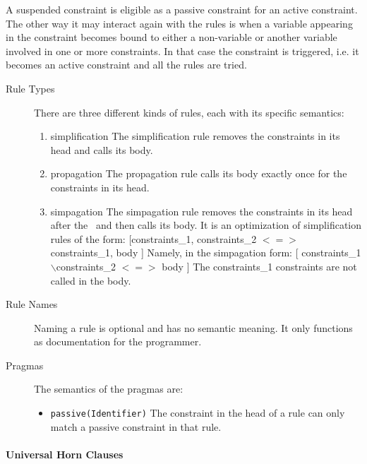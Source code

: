 \documentclass[thesis-solanki.tex]{subfiles}
\begin{document}
A suspended constraint is eligible as a passive constraint for an active constraint.
The other way it may interact again with the rules is when a variable appearing in the constraint becomes bound to
either a non-variable or another variable involved in one or more constraints.
In that case the constraint is triggered, i.e.\yyy{}{\Large,}
it becomes an active constraint and all the rules are tried.
\begin{description}

\item [Rule Types]
  There are three different kinds of rules, each with its specific semantics:
\begin{enumerate}

\item simplification
The simplification rule removes the constraints in its head and calls its body.

\item propagation
The propagation rule calls its body exactly once for the constraints in its head.

\item simpagation
The simpagation rule removes the constraints in its head after the \ and then calls its body. It is an optimization of simplification rules 
of the form: [constraints\_1, constraints\_2 $<=>$ constraints\_1, body ] Namely, in the simpagation form: [ constraints\_1 
$\backslash$constraints\_2 $<=>$ body ] The constraints\_1 constraints are not called in the body.

\end{enumerate}


\item [Rule Names] Naming a rule is optional and has no semantic meaning. It only functions as documentation for the programmer.

\item [Pragmas] The semantics of the pragmas are:

  \begin{itemize}
  \item \Verb!passive(Identifier)!
    The constraint in the head of a rule 
    can only match a passive constraint in that rule.  
  \end{itemize}
\end{description}

\paragraph{Universal Horn Clauses}
\end{document}
